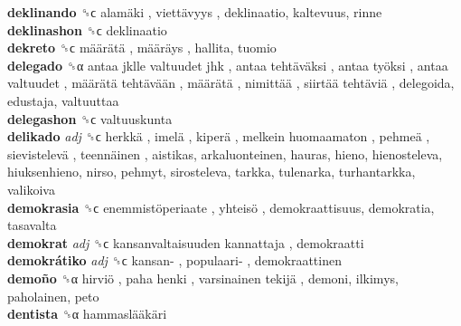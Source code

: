 \textbf{deklinando} ␝ϲ   alamäki ,  viettävyys , deklinaatio, kaltevuus, rinne  \\
\textbf{deklinashon} ␝ϲ  deklinaatio  \\
\textbf{dekreto} ␝ϲ   määrätä ,  määräys , hallita, tuomio  \\
\textbf{delegado} ␝α   antaa jklle valtuudet jhk ,  antaa tehtäväksi ,  antaa työksi ,  antaa valtuudet ,  määrätä tehtävään ,  määrätä ,  nimittää ,  siirtää tehtäviä , delegoida, edustaja, valtuuttaa  \\
\textbf{delegashon} ␝ϲ  valtuuskunta  \\
\textbf{delikado} \emph{adj}  ␝ϲ   herkkä ,  imelä ,  kiperä ,  melkein huomaamaton ,  pehmeä ,  sievistelevä ,  teennäinen , aistikas, arkaluonteinen, hauras, hieno, hienosteleva, hiuksenhieno, nirso, pehmyt, sirosteleva, tarkka, tulenarka, turhantarkka, valikoiva  \\
\textbf{demokrasia} ␝ϲ   enemmistöperiaate ,  yhteisö , demokraattisuus, demokratia, tasavalta  \\
\textbf{demokrat} \emph{adj}  ␝ϲ   kansanvaltaisuuden kannattaja , demokraatti  \\
\textbf{demokrátiko} \emph{adj}  ␝ϲ   kansan- ,  populaari- , demokraattinen  \\
\textbf{demoño} ␝α   hirviö ,  paha henki ,  varsinainen tekijä , demoni, ilkimys, paholainen, peto  \\
\textbf{dentista} ␝α   hammaslääkäri   \\
